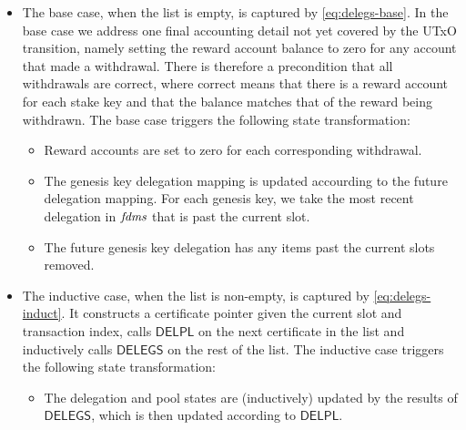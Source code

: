 \begin{itemize}
  \item The base case, when the list is empty, is captured by \cref{eq:delegs-base}.
    In the base case we address one final accounting detail not yet covered by the UTxO
    transition, namely setting the reward account balance to zero for any account that made a
    withdrawal.  There is therefore a precondition that all withdrawals are correct, where
    correct means that there is a reward account for each stake key and that the balance
    matches that of the reward being withdrawn.
    The base case triggers the following state transformation:
    \begin{itemize}
      \item Reward accounts are set to zero for each corresponding withdrawal.
      \item The genesis key delegation mapping is updated accourding to the future delegation
        mapping. For each genesis key, we take the most recent delegation in $\mathit{fdms}$
        that is past the current slot.
      \item The future genesis key delegation has any items past the current slots removed.
    \end{itemize}
  \item The inductive case, when the list is non-empty, is captured by \cref{eq:delegs-induct}.
    It constructs a certificate pointer given the current slot and transaction index,
    calls $\mathsf{DELPL}$ on the next certificate in the list and inductively
    calls $\mathsf{DELEGS}$ on the rest of the list.
    The inductive case triggers the following state transformation:
    \begin{itemize}
      \item The delegation and pool states are (inductively) updated by the results of
        $\mathsf{DELEGS}$, which is then updated according to $\mathsf{DELPL}$.
    \end{itemize}
\end{itemize}

